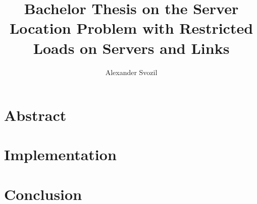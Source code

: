 \documentclass [12pt]{article}
\begin{document}
\author{Alexander Svozil}
\title{Bachelor Thesis on the Server Location Problem with Restricted Loads 
on Servers and Links}

\maketitle

\section{Abstract}
\cite{mirrorserver}
\tableofcontents
\section{Implementation}
\section{Conclusion}



\end{document}
